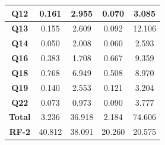 \begin{table}[t]
\begin{tabular}{|c|c|c|c|c|}
                \hline
                 \textbf{Q12}         & 0.161             & 2.955                         & 0.070             & 3.085                     \\ 
                \hline
                 \textbf{Q13}         & 0.155             & 2.609                         & 0.092             & 12.106                    \\ 
                \hline
                 \textbf{Q14}         & 0.050             & 2.008                         & 0.060             & 2.593                     \\ 
                \hline
                 \textbf{Q16}         & 0.383             & 1.708                         & 0.667             & 9.359                     \\ 
                \hline
                 \textbf{Q18}         & 0.768             & 6.949                         & 0.508             & 8.970                     \\ 
                \hline
                 \textbf{Q19}         & 0.140             & 2.553                         & 0.121             & 3.204                     \\ 
                \hline
                 \textbf{Q22}         & 0.073             & 0.973                         & 0.090             & 3.777                     \\ 
                \hline
                 \textbf{Total}       & 3.236             & 36.918                        & 2.184             & 74.606                    \\ 
                \hline
                 \textbf{RF-2}        & 40.812            & 38.091                        & 20.260            & 20.575                    \\
                \hline
                \end{tabular}
\end{table}



